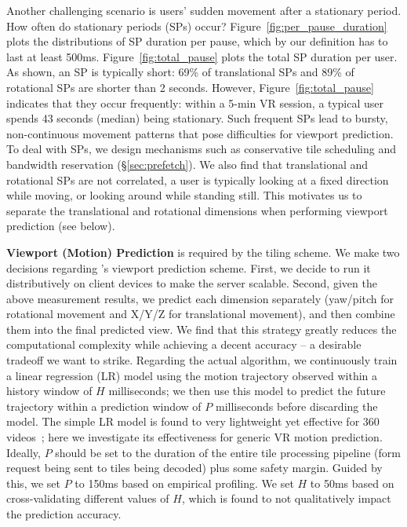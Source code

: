 Another challenging scenario is users' sudden movement after a stationary period. How often do stationary periods (SPs) occur? Figure~\ref{fig:per_pause_duration} plots the distributions of SP duration per pause, which by our definition has to last at least 500ms. %
%
Figure~\ref{fig:total_pause}  plots the total SP duration per user.
As shown, an SP is typically short: 69\% of translational SPs and 89\% of rotational SPs are shorter than 2 seconds. However, Figure~\ref{fig:total_pause} indicates that they occur frequently: within a 5-min VR session, a typical user spends 43 seconds (median) being stationary. Such frequent SPs lead to bursty, non-continuous movement patterns that pose difficulties for viewport prediction.
%
To deal with SPs, we design mechanisms such as conservative tile scheduling and bandwidth reservation (\S\ref{sec:prefetch}).
%
We also find that translational and rotational SPs are not correlated, \ie
a user is typically looking at a fixed direction while moving, or looking around while standing still.
This motivates us to separate the translational and rotational dimensions when performing viewport prediction (see below).

\textbf{Viewport (Motion) Prediction} is required by the tiling scheme.
We make two decisions regarding \firefly's viewport prediction scheme.
%
First, we decide to run it distributively on client devices to make the server scalable.
%
Second, given the above measurement results, we predict each dimension separately (yaw/pitch for rotational movement and X/Y/Z for translational movement), and then combine
them into the final predicted view. We find that this strategy greatly reduces the computational complexity while achieving a decent accuracy -- a desirable tradeoff we want to strike.
%
Regarding the actual algorithm, we continuously train a linear regression (LR) model using the motion trajectory observed within a history window of $H$ milliseconds; we then use this model to predict the future trajectory within a prediction window of $P$ milliseconds before discarding the model. The simple LR model is found to very lightweight yet effective for 360\degree{} videos~\cite{qian2018flare}; here we investigate its effectiveness for generic VR motion prediction. 
%
Ideally, $P$ should be set to the duration of the entire tile processing pipeline (form request being sent to tiles being decoded) plus some safety margin. Guided by this, we set $P$ to 150ms based on empirical profiling. We set $H$ to 50ms based on cross-validating different values of $H$, which is found to not qualitatively impact the prediction accuracy.

